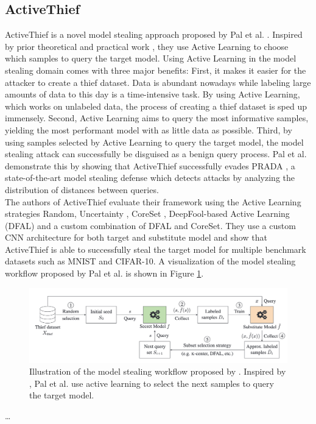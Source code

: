 \subsection{ActiveThief}
\label{sec:Related_work:Model_Stealing:ActiveThief}
ActiveThief is a novel model stealing approach proposed by Pal et al. \cite{pal2020activethief}. Inspired by prior theoretical \cite{chandrasekaran2020exploring}
and practical work \cite{shi2018active}, they use Active Learning to choose which samples to query the target model. Using Active Learning in the model stealing
domain comes with three major benefits: First, it makes it easier for the attacker to create a thief dataset. Data is abundant nowadays while labeling large amounts
of data to this day is a time-intensive task. By using Active Learning, which works on unlabeled data, the process of creating a thief dataset is sped up immensely.
Second, Active Learning aims to query the most informative samples, yielding the most performant model with as little data as possible. Third, by using samples selected
by Active Learning to query the target model, the model stealing attack can successfully be disguised as a benign query process. Pal et al. demonstrate this by showing 
that ActiveThief successfully evades PRADA \cite{juuti2019prada}, a state-of-the-art model stealing defense which detects attacks by analyzing the distribution of distances
between queries. \\
The authors of ActiveThief evaluate their framework using the Active Learning strategies Random, Uncertainty \cite{lewis1994sequential}, CoreSet \cite{sener2017active},
DeepFool-based Active Learning (DFAL) \cite{ducoffe2018adversarial} and a custom combination of DFAL and CoreSet. They use a custom CNN architecture for both target and
substitute model and show that ActiveThief is able to successfully steal the target model for multiple benchmark datasets such as MNIST and CIFAR-10. A visualization of
the model stealing workflow proposed by Pal et al. is shown in Figure \ref{fig:ActiveThief}.

\begin{figure} [ht]
    \centering
    \includegraphics[width=.9\linewidth]{images/ActiveThief_Idea.png}
    \caption[Visualization of ActiveThief]{Illustration of the model stealing workflow proposed by \cite{pal2020activethief}. Inspired by
    \cite{chandrasekaran2020exploring}, Pal et al. use active learning to select the next samples to query the target model.}
    \label{fig:ActiveThief}
\end{figure}

\dots
